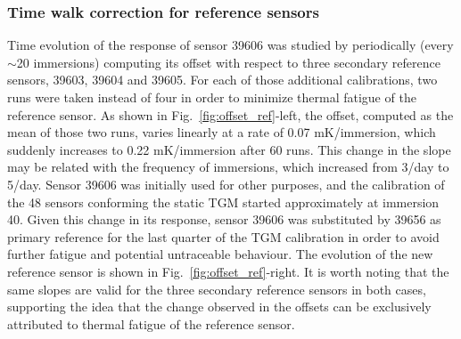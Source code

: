 \subsubsection{Time walk correction for reference sensors}
\label{sec:reference_corrections}
\noindent Time evolution of the response of sensor 39606 was studied by periodically (every $\sim$20 immersions)  computing its offset with respect to three secondary reference sensors, 39603, 39604 and 39605. For each of those additional calibrations, two runs were taken instead of four in order to minimize thermal fatigue of the reference sensor. As shown in Fig.~\ref{fig:offset_ref}-left, the offset, computed as the mean of those two runs, varies linearly at a rate of 0.07 mK/immersion, which suddenly increases to 0.22 mK/immersion after 60 runs. This change in the slope may be related with the frequency of immersions, which increased from 3/day to 5/day. Sensor 39606 was initially used for other purposes, and the calibration of the 48 sensors conforming the static TGM started approximately at immersion 40. Given this change in its response, sensor 39606 was substituted by 39656 as primary reference for the last quarter of the TGM calibration in order to avoid further fatigue and potential untraceable behaviour. The evolution of the new reference sensor is shown in Fig.~\ref{fig:offset_ref}-right. It is worth noting that the same slopes are valid for the three secondary reference sensors in both cases, supporting the idea that the change observed in the offsets can be exclusively attributed to thermal fatigue of the reference sensor. 

